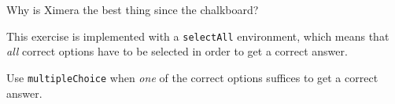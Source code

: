 \documentclass{ximera}
\begin{document}
\begin{exercise}
    Why is Ximera the best thing since the chalkboard?
    \begin{selectAll}
    \end{selectAll}
    \begin{feedback}
        This exercise is implemented with a \verb|selectAll| environment,
        which means that \textit{all} correct options have to be selected in order to get a correct answer.

        Use \verb|multipleChoice| when \textit{one} of the correct options suffices to get a correct answer.
        
    \end{feedback}
\end{exercise}
\end{document}
